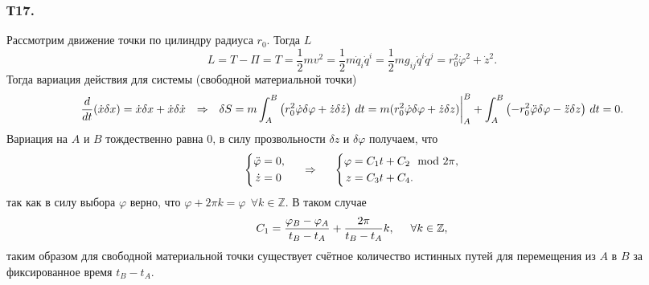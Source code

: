 \subsubsection*{Т17.}

Рассмотрим движение точки по цилиндру радиуса $r_0$. Тогда $L$ 
\begin{equation*}
    L  = T - \Pi = T = \frac{1}{2} m v^2 = \frac{1}{2} m \dot{q}_i \dot{q}^i
    = \frac{1}{2} m g_{ij} \dot{q}^i \dot{q}^j
    = r_0^2 \dot{\varphi}^2 + \dot{z}^2
    .
\end{equation*}
Тогда вариация действия для системы (свободной материальной точки)
\begin{equation*}
    \frac{d }{d t} (\dot{x} \delta x) = \dot{x} \delta x + \dot{x} \delta \dot{x}
    \hspace{0.25cm} \Rightarrow \hspace{0.25cm} 
    \delta S =
    m \int_A^B 
    \left( 
        r_0^2 \dot{\varphi} \delta \varphi + \dot{z} \delta \dot{z}
     \right)
    \, d t = 
    m (r_0^2 \dot{\varphi} \delta \varphi + \dot{z} \delta z)\bigg|_A^B
    + 
    \int_A^B 
    \left(
        -r_0^2 \ddot{\varphi} \delta \varphi - \ddot{z} \delta z
    \right) \, d t = 0.
\end{equation*}
Вариация на $A$ и $B$ тождественно равна 0, в силу прозвольности $\delta z$ и $\delta \varphi$ получаем, что
\begin{equation*}
    \left\{\begin{aligned}
        \ddot{\varphi} &= 0, \\
        \dot{z} &= 0
    \end{aligned}\right.
    \hspace{0.5cm} \Rightarrow \hspace{0.5cm} 
    \left\{\begin{aligned}
        \varphi &= C_1 t + C_2 \mod 2 \pi, \\
        z &= C_3 t + C_4.
    \end{aligned}\right.
\end{equation*}
так как в силу выбора $\varphi$ верно, что $\varphi + 2 \pi k = \varphi \ \  \forall k \in \mathbb{Z}$. В таком случае
\begin{equation*}
    C_1 = \frac{\varphi_B - \varphi_A}{t_B - t_A} + \frac{2\pi}{t_B - t_A} k,
    \hspace{0.5cm} \forall k \in \mathbb{Z},
\end{equation*}
таким образом для свободной материальной точки существует счётное количество истинных путей для перемещения из $A$ в $B$ за фиксированное время $t_B - t_A$.
